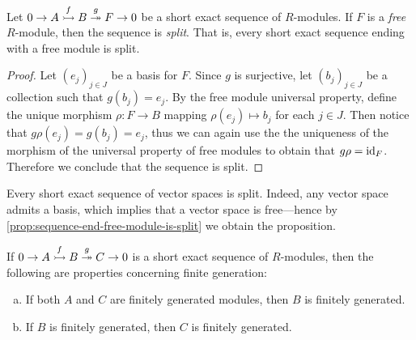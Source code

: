 \begin{proposition}
\label{prop:sequence-end-free-module-is-split}
Let \(0 \to A \overset{f}{\rightarrowtail} B \overset{g}{\twoheadrightarrow} F \to 0\) be a short exact
sequence of \(R\)-modules. If \(F\) is a \emph{free} \(R\)-module, then the
sequence is \emph{split}. That is, every short exact sequence ending with a free
module is split.
\end{proposition}

\begin{proof}
Let \((e_j)_{j \in J}\) be a basis for \(F\). Since \(g\) is surjective, let
\((b_j)_{j \in J}\) be a collection such that \(g(b_j) = e_j\). By the free
module universal property, define the unique morphism \(\rho: F \to B\) mapping
\(\rho(e_j) \mapsto b_j\) for each \(j \in J\). Then notice that
\(g \rho(e_j) = g(b_j) = e_j\), thus we can again use the the uniqueness of the
morphism of the universal property of free modules to obtain that
\(g \rho = \operatorname{id}_F\). Therefore we conclude that the sequence is split.
\end{proof}

\begin{example}
\label{exp:short-exact-seq-vect-spaces-split}
Every short exact sequence of vector spaces is split. Indeed, any vector space
admits a basis, which implies that a vector space is free---hence by
\cref{prop:sequence-end-free-module-is-split} we obtain the proposition.
\end{example}

\begin{proposition}
\label{prop:short-exact-finitely-generated}
If \(0 \to A \overset{f}{\rightarrowtail} B \overset{g}{\twoheadrightarrow} C \to 0\) is a short exact
sequence of \(R\)-modules, then the following are properties concerning finite
generation:
\begin{enumerate}[(a)]\setlength\itemsep{0em}
\item If both \(A\) and \(C\) are finitely generated modules, then \(B\) is
  finitely generated.

\item If \(B\) is finitely generated, then \(C\) is finitely generated.
\end{enumerate}
\end{proposition}

